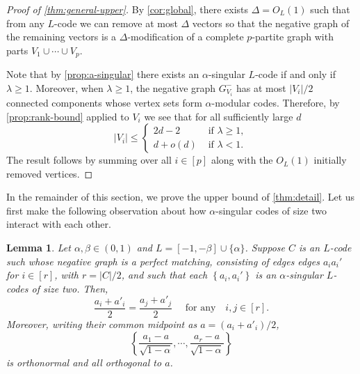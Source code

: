 \documentclass[reqno, 11pt]{amsart}
\newtheorem{lemma}[theorem]{Lemma}
\theoremstyle{definition}
\theoremstyle{remark}
\newcommand{\abs}[1]{\left\lvert#1\right\rvert}
\newcommand{\set}[1]{\left\{ #1 \right\}}
\begin{document}
\begin{proof}[Proof of \cref{thm:general-upper}]
    By  \cref{cor:global}, there exists $\Delta = O_L(1)$ such that from any $L$-code we can remove at most $\Delta$ vectors so that the negative graph of the remaining vectors is a $\Delta$-modification of a complete $p$-partite graph with parts $V_1 \cup \cdots \cup V_p$. 

    Note that by \cref{prop:a-singular} there exists an $\alpha$-singular $L$-code if and only if $\lambda \geq 1$. Moreover, when $\lambda \geq 1$, the negative graph $G_{V_i}^-$ has at most $|V_i|/2$ connected components whose vertex sets form $\alpha$-modular codes. Therefore, by \cref{prop:rank-bound} applied to $V_i$ we see that for all sufficiently large $d$
    \[
        |V_i| \leq \begin{cases}
                    2d - 2 & \text{ if } \lambda \geq 1, \\
                    d + o(d) & \text{ if } \lambda < 1.
                    \end{cases}
    \]
    The result follows by summing over all $i \in [p]$ along with the $O_L(1)$ initially removed vertices.
\end{proof}

In the remainder of this section, we prove the upper bound of \cref{thm:detail}. Let us first make the following observation about how $\alpha$-singular codes of size two interact with each other.


\begin{lemma}\label{lem:a-singular-edges} Let $\alpha, \beta \in (0,1)$ and $L = [-1, -\beta] \cup \{\alpha\}$. Suppose $C$ is an $L$-code such whose negative graph is a perfect matching, consisting of edges edges $a_ia_i'$ for $i \in [r]$, with $r = \abs{C}/2$, and such that each $\set{a_i,a_i'}$ is an $\alpha$-singular $L$-codes of size two. Then, 
\[
    \frac{ a_i + a'_i}{2} =  \frac{ a_j + a'_j}{2} \quad \text{ for any} \quad  i, j \in [r].
\]
Moreover, writing their common midpoint as $ a = (a_i + a'_i) / 2$,
\[
    \left\{ \frac{ a_1 -  a}{\sqrt{1-\alpha}}, \cdots,  \frac{ a_r -  a}{\sqrt{1-\alpha}}\right\}
\]
is orthonormal and all orthogonal to $a$.   
\end{lemma}
\end{document}
